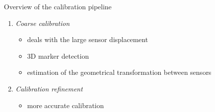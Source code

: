 \documentclass[pdf]{beamer}
\begin{document}
	\begin{frame}{Overview of the calibration pipeline}
		\begin{enumerate}
			\item \emph{Coarse calibration}
			\begin{itemize}
				\item deals with the large sensor displacement
				\item $3$D marker detection %
				\item estimation of the geometrical transformation between sensors %
			\end{itemize}

		\begin{figure}[h]
			\centering
			\quad\quad			
		\end{figure}

			\item \emph{Calibration refinement}
			\begin{itemize}
				\item more accurate calibration
			\end{itemize}
		\end{enumerate}
	\end{frame}
\end{document}
